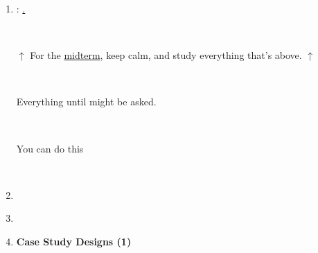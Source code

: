 \documentclass[letterpaper]{article}
\begin{document}
\begin{enumerate}
\vspace{-0.1cm}
\item[] \begin{center}{\color{blue}{\bf Midterm}: \underline{{\unskip}.}}\end{center}
	~\\ 
	\vspace{-1cm}\begin{center}$\uparrow$ {\color{blue}For the \underline{midterm}, keep calm, and study everything that's above.} $\uparrow$ \end{center}
	~\\
	\vspace{-1cm}\begin{center} {\color{blue} Everything until {\unskip} might be asked.}\end{center}
	~\\
	\vspace{-1.5cm}\begin{center}\Smiley{} {\color{blue}You can do this} \Smiley{} \end{center}
	~\\ 

\vspace{-1cm}
\item[] \begin{center}{} \end{center}
\vspace{-0.05cm}


\vspace{-0.01cm}
\item[] \begin{center}{} \end{center}
\vspace{0.5cm}



\item {\bf Case Study Designs (1)}
		

\end{enumerate}
\end{document}
